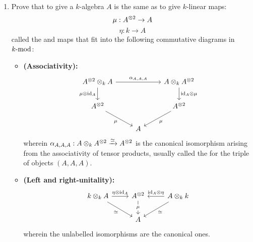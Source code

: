         \begin{question}
            \begin{enumerate}
                \item Prove that to give a $k$-algebra $A$ is the same as to give $k$-linear maps:
                    $$\mu: A^{\tensor 2} \to A$$
                    $$\eta: k \to A$$
                called the  and  maps that fit into the following commutative diagrams in $k\mod$:
                \begin{itemize}
                    \item \textbf{(Associativity):}
                        $$
                            \begin{tikzcd}
                        	{A^{\tensor 2} \tensor_k A} && {A \tensor_k A^{\tensor 2}} \\
                        	{A^{\tensor 2}} && {A^{\tensor 2}} \\
                        	& A
                        	\arrow["{\alpha_{A, A, A}}", from=1-1, to=1-3]
                        	\arrow["{\mu \tensor \id_A}"', from=1-1, to=2-1]
                        	\arrow["{\id_A \tensor \mu}", from=1-3, to=2-3]
                        	\arrow["\mu"', from=2-1, to=3-2]
                        	\arrow["\mu", from=2-3, to=3-2]
                            \end{tikzcd}
                        $$
                    wherein $\alpha_{A, A, A}: A \tensor_k A^{\tensor 2} \xrightarrow[]{\cong} A^{\tensor 2}$ is the canonical isomorphism arising from the associativity of tensor products, usually called the  for the triple of objects $(A, A, A)$. 
                    \item \textbf{(Left and right-unitality):}
                        $$
                            \begin{tikzcd}
                        	{k \tensor_k A} & {A^{\tensor 2}} & {A \tensor_k k} \\
                        	& A
                        	\arrow["{\eta \tensor \id_A}", from=1-1, to=1-2]
                        	\arrow["\cong"', from=1-1, to=2-2]
                        	\arrow["\mu"{description}, from=1-2, to=2-2]
                        	\arrow["{\id_A \tensor \eta}"', from=1-3, to=1-2]
                        	\arrow["\cong", from=1-3, to=2-2]
                            \end{tikzcd}
                        $$
                    wherein the unlabelled isomorphisms are the canonical ones. 

\end{itemize}
\end{enumerate}
\end{question}
